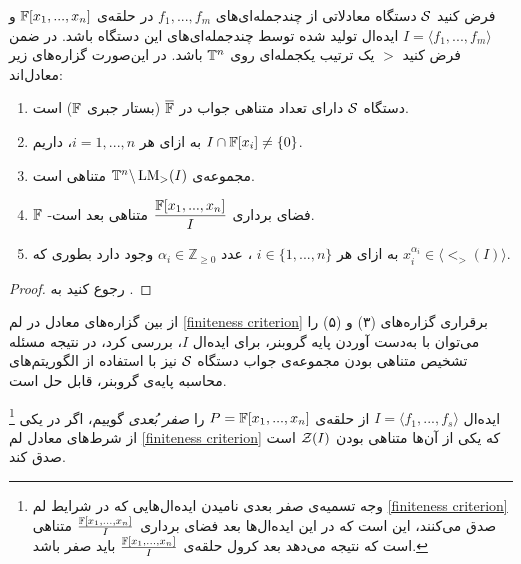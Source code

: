 \begin{lemma}
	\label{finiteness criterion}
	فرض کنید 
	${\mathcal S}$
	دستگاه معادلاتی از چندجمله‌ای‌های 
	$f_{1},...,f_{m}$
	در حلقه‌ی 
	$\mathbb{F}[x_{1},...,x_{n}]$
	و 
	$I = \langle f_{1},...,f_{m}\rangle$
	ایده‌ال تولید شده توسط چندجمله‌ای‌های این دستگاه باشد. در ضمن فرض کنید 
	$>$
	یک ترتیب یکجمله‌ای روی 
	${\mathbb{T}}^{n}$
	باشد.  در این‌صورت گزاره‌های زیر معادل‌اند:
	\begin{enumerate}
		\item
		دستگاه 
		${\mathcal S}$
		دارای تعداد متناهی جواب در 
		$\overline{\mathbb{F}}$
		(بستار جبری 
		$\mathbb{F}$)
		است.
		\item
		به ازای هر 
		$i = 1,...,n$، 
 داریم  
		$I\cap\mathbb{F}[x_{i}]\neq \{0\}$.
		\item
		مجموعه‌ی 
		${\mathbb{T}}^{n}\backslash \operatorname{\mathrm{LM}}_{>}(I)$
		متناهی است.
		\item
		$\mathbb{F}$
		-فضای برداری 
		$\dfrac{\mathbb{F}[x_{1},...,x_{n}]}{I}$
		متناهی بعد است.
		\item
		به ازای هر 
		$i\in\{1,...,n\}$
		، عدد 
		$\alpha_{i}\in\mathbb{Z}_{\geq 0}$
		وجود دارد بطوری که 
		$x_{i}^{\alpha_{i}}\in\langle\lt_{>}(I)\rangle$.
	\end{enumerate}
\end{lemma}
\begin{proof}
	رجوع کنید به
	\cite[ص.۲۴۳]{cca1_kreuzer}.
\end{proof}
از بین گزاره‌های معادل در لم
\ref{finiteness criterion}
برقراری گزاره‌های (۳) و (۵) را می‌توان با به‌دست  آوردن پایه‌  گروبنر، برای ایده‌ال 
$I$،
بررسی کرد، در نتیجه مسئله‌  تشخیص متناهی بودن مجموعه‌ی جواب دستگاه 
${\mathcal S}$
نیز با استفاده از الگوریتم‌‌های محاسبه‌  پایه‌ی گروبنر، قابل حل است.

\begin{definition}
	\footnote{وجه تسمیه‌ی صفر بعدی نامیدن اید‌ه‌ال‌هایی که در شرایط لم
		\ref{finiteness criterion}
		صدق می‌کنند، این است که در این ایده‌ال‌ها بعد فضای برداری 
		$\frac{\mathbb{F}[x_{1},...,x_{n}]}{I}$
		متناهی است که نتیجه می‌دهد بعد کرول حلقه‌ی 
		$\frac{\mathbb{F}[x_{1},...,x_{n}]}{I}$
		باید صفر باشد.}
	ایده‌ال 
	$I = \langle f_{1},...,f_{s}\rangle$
	از حلقه‌ی 
	$P = \mathbb{F}[x_{1},...,x_{n}]$
	را 
	\textit{صفر بُعدی}
	گوییم، اگر در یکی از شرط‌های معادل لم 
	\ref{finiteness criterion}
	که یکی از آن‌ها متناهی بودن 
	${\mathcal Z}(I)$
	است صدق کند.
\end{definition}


